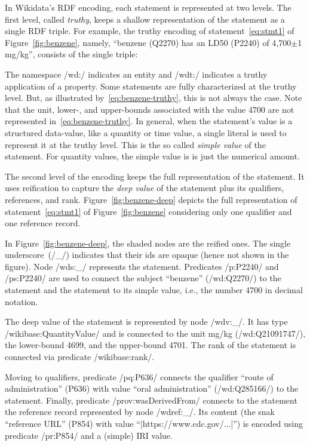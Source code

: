 In Wikidata's RDF encoding, each statement is represented at two levels.
The first level, called \emph{truthy}, keeps a shallow representation of the statement as a single RDF triple.
For example, the truthy encoding of statement~\eqref{eq:stmt1} of Figure~\ref{fig:benzene}, namely, ``benzene (Q2270) has an LD50 (P2240) of 4{,}700$ \pm$1 mg/kg'', consists of the single triple:

The namespace \code/wd:/ indicates an entity and \code/wdt:/ indicates a truthy application of a property.
Some statements are fully characterized at the truthy level.
But, as illustrated by~\eqref{eq:benzene-truthy}, this is not always the case.
Note that the unit, lower-, and upper-bounds associated with the value 4700 are not represented in~\eqref{eq:benzene-truthy}.
In general, when the statement's value is a structured data-value, like a quantity or time value, a single literal is used to represent it at the truthy level.
This is the so called \emph{simple value} of the statement.
For quantity values, the simple value is is just the numerical amount.




The second level of the encoding keeps the full representation of the statement.
It uses reification to capture the \emph{deep value} of the statement plus its qualifiers, references, and rank.
Figure~\ref{fig:benzene-deep} depicts the full representation of statement~\eqref{eq:stmt1} of Figure~\ref{fig:benzene} considering only one qualifier and one reference record.





In Figure~\ref{fig:benzene-deep}, the shaded nodes are the reified ones.
The single underscore~(\code/_/) indicates that their ids are opaque (hence not shown in the figure).
Node \code/wds:_/ represents the statement.
Predicates \code/p:P2240/ and \code/ps:P2240/ are used to connect the subject ``benzene'' (\code/wd:Q2270/) to the statement and the statement to its simple value, i.e., the number 4700 in decimal notation.

The deep value of the statement is represented by node \code/wdv:_/.
It has type \code/wikibase:QuantityValue/ and is connected to the unit mg/kg (\code/wd:Q21091747/), the lower-bound 4699, and the upper-bound 4701.
The rank of the statement is connected via predicate \code/wikibase:rank/.

Moving to qualifiers, predicate \code/pq:P636/ connects the qualifier ``route of administration'' (P636) with value ``oral administration'' (\code/wd:Q285166/) to the statement.
Finally, predicate \code/prov:wasDerivedFrom/ connects to the statement the reference record represented by node \code/wdref:_/.
Its content (the snak ``reference URL'' (P854) with value ``\code|https://www.cdc.gov/...|'') is encoded using predicate \code/pr:P854/ and a (simple) IRI value.





